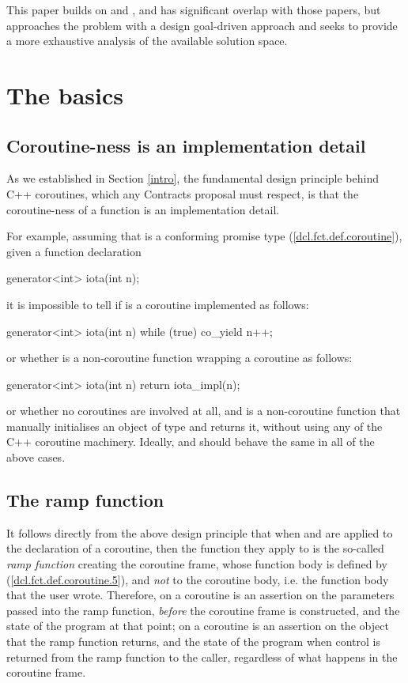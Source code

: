 This paper builds on \cite{P2957R1} and \cite{P3251R0}, and has significant overlap with those papers, but approaches the problem with a design goal-driven approach and seeks to provide a more exhaustive analysis of the available solution space.

\section{The basics}

\subsection{Coroutine-ness is an implementation detail}
\label{impldetail}

As we established in Section \ref{intro}, the fundamental design principle behind C++ coroutines, which any Contracts proposal must respect, is that the coroutine-ness of a function  is an implementation detail.

For example, assuming that  is a conforming promise type (\href{https://eel.is/c++draft/dcl.fct.def.coroutine}{[dcl.fct.def.coroutine]}), given a function declaration 
\begin{codeblock}
generator<int> iota(int n); 
\end{codeblock}
it is impossible to tell if  is a coroutine implemented as follows:
\begin{codeblock}
generator<int> iota(int n) {
  while (true)
    co_yield n++;
}
\end{codeblock}
or whether  is a non-coroutine function wrapping a coroutine as follows:
\begin{codeblock}
generator<int> iota(int n) {
  return iota_impl(n);
}
\end{codeblock}
or whether no coroutines are involved at all, and  is a non-coroutine function that manually initialises an object of type  and returns it, without using any of the C++ coroutine machinery. Ideally,  and  should behave the same in all of the above cases.

\subsection{The ramp function}

It follows directly from the above design principle that when  and  are applied to the declaration of a coroutine, then the function they apply to is the so-called \emph{ramp function} creating the coroutine frame, whose function body is defined by ([\href{https://eel.is/c++draft/dcl.fct.def.coroutine#5}{dcl.fct.def.coroutine.5}]), and \emph{not} to the coroutine body, i.e. the function body that the user wrote. Therefore,  on a coroutine is an assertion on the parameters passed into the ramp function, \emph{before} the coroutine frame is constructed, and the state of the program at that point;  on a coroutine is an assertion on the object that the ramp function returns, and the state of the program when control is returned from the ramp function to the caller, regardless of what happens in the coroutine frame.

